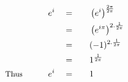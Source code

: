 \begin{alignat*}{5}
&\,&e^i\quad&=\quad&&\left(e^i\right)^\frac{2\pi}{2\pi}\\
&\,&\,&=&&\left(e^{i\pi}\right)^{2.\frac{1}{2\pi}}\\
&\,&\,&=&&(-1)^{2.\frac{1}{2\pi}}\\
&\,&\,&=&&1^\frac{1}{2\pi}\\
&\small\text{Thus}\normalsize\qquad&e^i\quad&=&&1
\end{alignat*}
